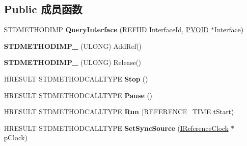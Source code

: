 \subsection*{Public 成员函数}
\begin{DoxyCompactItemize}
\item 
\mbox{\label{class_c_ks_clock_forwarder_ac3d9e2f6a42cc281ca94fb92626eacaa}} 
S\+T\+D\+M\+E\+T\+H\+O\+D\+I\+MP {\bfseries Query\+Interface} (R\+E\+F\+I\+ID Interface\+Id, \hyperlink{interfacevoid}{P\+V\+O\+ID} $\ast$Interface)
\item 
\mbox{\label{class_c_ks_clock_forwarder_a89e326c31cc4e4b5b38b2e8ca56dcb14}} 
{\bfseries S\+T\+D\+M\+E\+T\+H\+O\+D\+I\+M\+P\+\_\+} (U\+L\+O\+NG) Add\+Ref()
\item 
\mbox{\label{class_c_ks_clock_forwarder_a0ba9df2700d6a34c5c7acb169dc5f901}} 
{\bfseries S\+T\+D\+M\+E\+T\+H\+O\+D\+I\+M\+P\+\_\+} (U\+L\+O\+NG) Release()
\item 
\mbox{\label{class_c_ks_clock_forwarder_a1e343faba9e44649078507d5670833b9}} 
H\+R\+E\+S\+U\+LT S\+T\+D\+M\+E\+T\+H\+O\+D\+C\+A\+L\+L\+T\+Y\+PE {\bfseries Stop} ()
\item 
\mbox{\label{class_c_ks_clock_forwarder_a148d5c956f19fe3b6ee161906dc6f42a}} 
H\+R\+E\+S\+U\+LT S\+T\+D\+M\+E\+T\+H\+O\+D\+C\+A\+L\+L\+T\+Y\+PE {\bfseries Pause} ()
\item 
\mbox{\label{class_c_ks_clock_forwarder_a4c512f84f8147c98129273c01229ea17}} 
H\+R\+E\+S\+U\+LT S\+T\+D\+M\+E\+T\+H\+O\+D\+C\+A\+L\+L\+T\+Y\+PE {\bfseries Run} (R\+E\+F\+E\+R\+E\+N\+C\+E\+\_\+\+T\+I\+ME t\+Start)
\item 
\mbox{\label{class_c_ks_clock_forwarder_a7bc6434f5d9e8ebdd07a323a4623a3ce}} 
H\+R\+E\+S\+U\+LT S\+T\+D\+M\+E\+T\+H\+O\+D\+C\+A\+L\+L\+T\+Y\+PE {\bfseries Set\+Sync\+Source} (\hyperlink{interface_i_reference_clock}{I\+Reference\+Clock} $\ast$p\+Clock)
\item 
\mbox{\label{class_c_ks_clock_forwarder_a056674cf6746d176f022a18f3bb5bdc6}} 

\end{DoxyCompactItemize}
